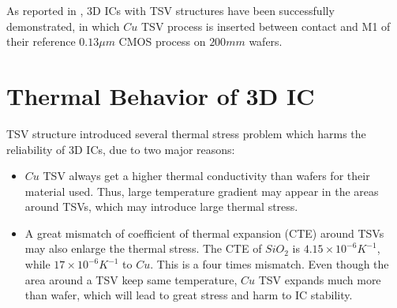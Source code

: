
As reported in \cite{Olmen20083D}, 3D ICs with TSV structures have been successfully demonstrated, 
in which $Cu$ TSV process is inserted between contact and M1 of their reference $0.13 \mu m$ CMOS process on
$200mm$ wafers. 

\section{Thermal Behavior of 3D IC} \label{sec::thermal}
TSV structure introduced several thermal stress problem which harms the reliability of 3D ICs, due to
two major reasons:
\begin{itemize}
    \item $Cu$ TSV always get a higher thermal conductivity than wafers for their material used.
    Thus, large temperature gradient may appear in the areas around TSVs, which may
    introduce large thermal stress.
    \item A great mismatch of coefficient of thermal expansion (CTE) around TSVs may also enlarge 
    the thermal stress. The CTE of $SiO_2$ is $4.15\times10^{-6}K^{-1}$, while
    $17\times10^{-6}K^{-1}$ to $Cu$. This is a four times mismatch.
    Even though the area around a TSV keep same temperature, $Cu$ TSV expands much more than
    wafer, which will lead to great stress and harm to IC stability.
\end{itemize}

